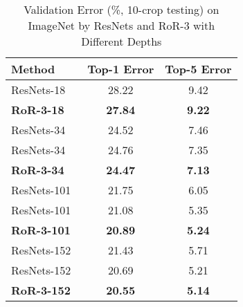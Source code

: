 \documentclass[journal]{IEEEtran}
\begin{document}
\begin{table}[!t]
\renewcommand{\arraystretch}{1.3}
\caption{Validation Error (\%, 10-crop testing) on ImageNet by ResNets and RoR-3 with Different Depths}
\label{tab:imagenet}
\centering
\begin{tabular}{|l|c|c|}
\hline
Method                                       &Top-1 Error             &Top-5 Error  \\ \hline\hline
ResNets-18~\cite{gross2016facebookres}       &28.22                                  &9.42               \\\hline
\textbf{RoR-3-18}                            &\textbf{27.84}                                   &\textbf{9.22}                \\\hline
ResNets-34~\cite{he2015resnets}              &24.52                                  &7.46               \\\hline
ResNets-34~\cite{gross2016facebookres}       &24.76                                  &7.35               \\\hline
\textbf{RoR-3-34}                            &\textbf{24.47}                                   &\textbf{7.13}                \\\hline
ResNets-101~\cite{he2015resnets}             &21.75                                  &6.05               \\\hline
ResNets-101~\cite{gross2016facebookres}      &21.08                                  &5.35               \\\hline
\textbf{RoR-3-101}                           &\textbf{20.89}                                   &\textbf{5.24}               \\\hline
ResNets-152~\cite{he2015resnets}             &21.43                                  &5.71               \\\hline
ResNets-152~\cite{gross2016facebookres}      &20.69                                  &5.21               \\\hline
\textbf{RoR-3-152}                           &\textbf{20.55}                                   &\textbf{5.14}                \\\hline
\end{tabular}
\end{table}
\end{document}

